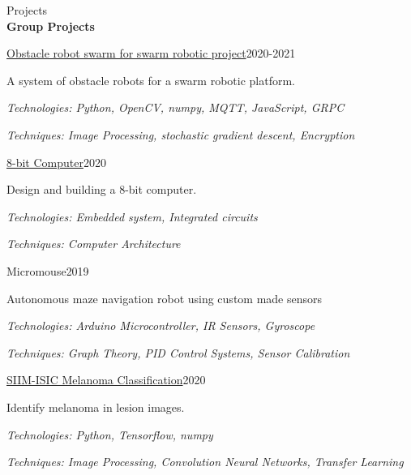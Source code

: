 \documentclass{resume} %
\begin{document}
\clearpage

\begin{rSection}{Projects}\\

\textbf{Group Projects}\\

\begin{rSubsection}{\href{https://github.com/dtdinidu7/e16-3yp-obstacle-bots-for-swarm-robots}{Obstacle robot swarm for swarm robotic project}}{2020-2021}{}{}
\item A system of obstacle robots for a swarm robotic platform. \item 
\textit{Technologies: Python, OpenCV, numpy, MQTT, JavaScript, GRPC}
\item \textit{Techniques: Image Processing, stochastic gradient descent, Encryption }
\end{rSubsection}

\begin{rSubsection}{\href{https://github.com/HeshanDissanayake/8-bit-computer}{8-bit Computer}}{2020}{}{}
\item Design and building a 8-bit computer. \item 
\textit{Technologies: Embedded system, Integrated circuits}
\item \textit{Techniques: Computer Architecture }
\end{rSubsection}

\begin{rSubsection}{Micromouse}{2019}{}{}
\item Autonomous maze navigation robot using custom made sensors 
\item \textit{Technologies: Arduino Microcontroller, IR Sensors, Gyroscope} 
\item \textit{Techniques: Graph Theory, PID Control Systems, Sensor Calibration}
\end{rSubsection}

\begin{rSubsection}{\href{https://github.com/HeshanDissanayake/SIIM_ISIC_melanoma_classification}{SIIM-ISIC Melanoma Classification}}{2020}{}{}
\item Identify melanoma in lesion images. \item 
\textit{Technologies: Python, Tensorflow, numpy}
\item \textit{Techniques: Image Processing, Convolution Neural Networks, Transfer Learning }
\newline


\end{rSubsection}
\end{rSection}
\end{document}

